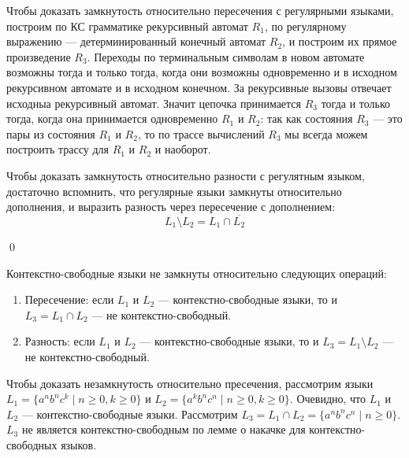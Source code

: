 Чтобы доказать замкнутость относительно пересечения с регулярными языками, построим по КС грамматике рекурсивный автомат $R_1$, по регулярному выражению --- детерминированный конечный автомат $R_2$, и построим их прямое произведение $R_3$.
Переходы по терминальным символам в новом автомате возможны тогда и только тогда, когда они возможны одновременно и в исходном рекурсивном автомате и в исходном конечном.
За рекурсивные вызовы отвечает исходныа рекурсивный автомат.
Значит цепочка принимается $R_3$ тогда и только тогда, когда она принимается одновременно $R_1$ и $R_2$: так как состояния $R_3$ --- это пары из состояния $R_1$ и $R_2$, то по трассе вычислений $R_3$ мы всегда можем построить трассу для $R_1$ и $R_2$ и наоборот.

Чтобы доказать замкнутость относительно разности с регулятным языком, достаточно вспомнить, что регулярные языки замкнуты относительно дополнения, и выразить разность через пересечение с дополнением:
$$
L_1 \setminus L_2 = L_1 \cap \overline{L_2}
$$

\qed

\begin{theorem}
Контекстно-свободные языки не замкнуты относительно следующих операций:
\begin{enumerate}
  \item Пересечение: если $L_1$ и $L_2$ --- контекстно-свободные языки, то и $L_3 = L_1 \cap L_2$ --- не контекстно-свободный.
  \item Разность: если $L_1$ и $L_2$ --- контекстно-свободные языки, то и $L_3 = L_1 \setminus L_2$ --- не контекстно-свободный.
\end{enumerate}
\end{theorem}

Чтобы доказать незамкнутость относительно пресечения, рассмотрим языки $L_1 = \{a^n b^n c^k \mid n \geq 0, k \geq 0\}$ и $L_2 = \{a^k b^n c^n \mid n \geq 0, k \geq 0\}$.
Очевидно, что $L_1$ и $L_2$ --- контекстно-свободные языки.
Рассмотрим $L_3 = L_1 \cap L_2 = \{a^n b^n c^n \mid n \geq 0\}$.
$L_3$ не является контекстно-свободным по лемме о накачке для контекстно-свободных языков.

